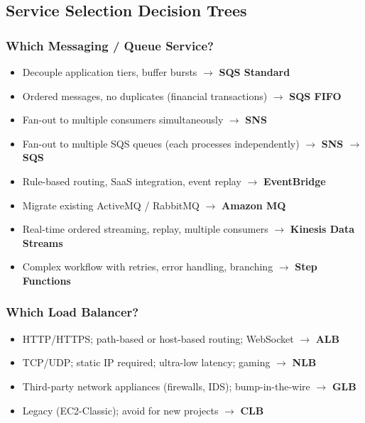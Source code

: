 \subsection{Service Selection Decision Trees}

\subsubsection{Which Messaging / Queue Service?}

\begin{keyfacts}
\begin{itemize}
  \item Decouple application tiers, buffer bursts $\to$ \textbf{SQS Standard}
  \item Ordered messages, no duplicates (financial transactions) $\to$ \textbf{SQS FIFO}
  \item Fan-out to multiple consumers simultaneously $\to$ \textbf{SNS}
  \item Fan-out to multiple SQS queues (each processes independently) $\to$ \textbf{SNS $\to$ SQS}
  \item Rule-based routing, SaaS integration, event replay $\to$ \textbf{EventBridge}
  \item Migrate existing ActiveMQ / RabbitMQ $\to$ \textbf{Amazon MQ}
  \item Real-time ordered streaming, replay, multiple consumers $\to$ \textbf{Kinesis Data Streams}
  \item Complex workflow with retries, error handling, branching $\to$ \textbf{Step Functions}
\end{itemize}
\end{keyfacts}

\subsubsection{Which Load Balancer?}

\begin{keyfacts}
\begin{itemize}
  \item HTTP/HTTPS; path-based or host-based routing; WebSocket $\to$ \textbf{ALB}
  \item TCP/UDP; static IP required; ultra-low latency; gaming $\to$ \textbf{NLB}
  \item Third-party network appliances (firewalls, IDS); bump-in-the-wire $\to$ \textbf{GLB}
  \item Legacy (EC2-Classic); avoid for new projects $\to$ \textbf{CLB}
\end{itemize}
\end{keyfacts}

